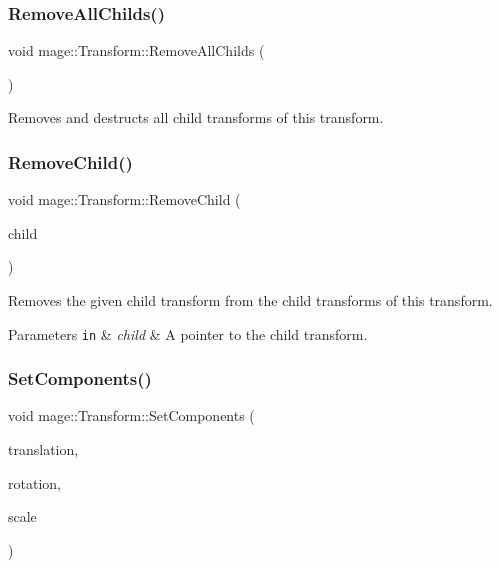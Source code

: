 \subsubsection{\texorpdfstring{Remove\+All\+Childs()}{RemoveAllChilds()}}
{\footnotesize\ttfamily void mage\+::\+Transform\+::\+Remove\+All\+Childs (\begin{DoxyParamCaption}{ }\end{DoxyParamCaption})}

Removes and destructs all child transforms of this transform. \hypertarget{structmage_1_1_transform_a387bb274fec0cc5ea8d6f3504536ad50}{}\label{structmage_1_1_transform_a387bb274fec0cc5ea8d6f3504536ad50} 
\subsubsection{\texorpdfstring{Remove\+Child()}{RemoveChild()}}
{\footnotesize\ttfamily void mage\+::\+Transform\+::\+Remove\+Child (\begin{DoxyParamCaption}\item[{\hyperlink{namespacemage_a1e01ae66713838a7a67d30e44c67703e}{Shared\+Ptr}$<$ \hyperlink{structmage_1_1_transform}{Transform} $>$}]{child }\end{DoxyParamCaption})}

Removes the given child transform from the child transforms of this transform.


\begin{DoxyParams}[1]{Parameters}
\mbox{\tt in}  & {\em child} & A pointer to the child transform. \\
\hline
\end{DoxyParams}
\hypertarget{structmage_1_1_transform_aba5311db1360a15aea4de33a060ab27e}{}\label{structmage_1_1_transform_aba5311db1360a15aea4de33a060ab27e} 
\subsubsection{\texorpdfstring{Set\+Components()}{SetComponents()}\hspace{0.1cm}{\footnotesize\ttfamily [1/2]}}
{\footnotesize\ttfamily void mage\+::\+Transform\+::\+Set\+Components (\begin{DoxyParamCaption}\item[{const X\+M\+F\+L\+O\+A\+T3 \&}]{translation,  }\item[{const X\+M\+F\+L\+O\+A\+T3 \&}]{rotation,  }\item[{const X\+M\+F\+L\+O\+A\+T3 \&}]{scale }\end{DoxyParamCaption})}

